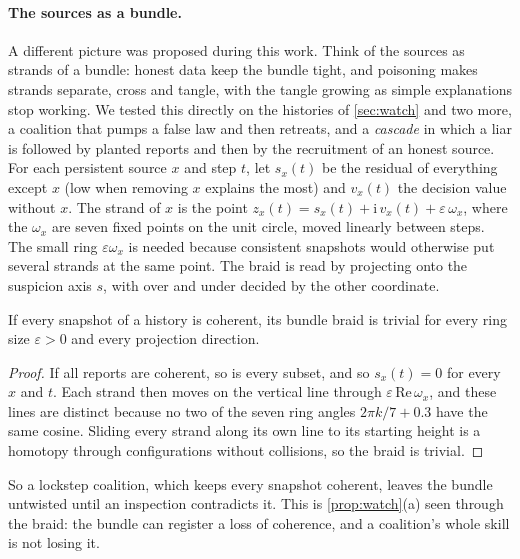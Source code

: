 \documentclass[11pt]{article}
\theoremstyle{definition}\newtheorem{definition}[theorem]{Definition}\newtheorem{remark}[theorem]{Remark}\newtheorem{example}[theorem]{Example}\newtheorem{problem}[theorem]{Open problem}\crefname{problem}{Problem}{Problems}
\begin{document}
\paragraph{The sources as a bundle.} A different picture was proposed during this work. Think of the sources as strands of a bundle: honest data keep the bundle tight, and poisoning makes strands separate, cross and tangle, with the tangle growing as simple explanations stop working. We tested this directly on the histories of \cref{sec:watch} and two more, a coalition that pumps a false law and then retreats, and a \emph{cascade} in which a liar is followed by planted reports and then by the recruitment of an honest source. For each persistent source $x$ and step $t$, let $s_x(t)$ be the residual of everything except $x$ (low when removing $x$ explains the most) and $v_x(t)$ the decision value without $x$. The strand of $x$ is the point $z_x(t)=s_x(t)+\mathrm i\,v_x(t)+\varepsilon\,\omega_x$, where the $\omega_x$ are seven fixed points on the unit circle, moved linearly between steps. The small ring $\varepsilon\omega_x$ is needed because consistent snapshots would otherwise put several strands at the same point. The braid is read by projecting onto the suspicion axis $s$, with over and under decided by the other coordinate.

\begin{proposition}\label{prop:cohtrivial}
If every snapshot of a history is coherent, its bundle braid is trivial for every ring size $\varepsilon>0$ and every projection direction.
\end{proposition}

\begin{proof}
If all reports are coherent, so is every subset, and so $s_x(t)=0$ for every $x$ and $t$. Each strand then moves on the vertical line through $\varepsilon\,\mathrm{Re}\,\omega_x$, and these lines are distinct because no two of the seven ring angles $2\pi k/7+0.3$ have the same cosine. Sliding every strand along its own line to its starting height is a homotopy through configurations without collisions, so the braid is trivial.
\end{proof}

So a lockstep coalition, which keeps every snapshot coherent, leaves the bundle untwisted until an inspection contradicts it. This is \cref{prop:watch}(a) seen through the braid: the bundle can register a loss of coherence, and a coalition's whole skill is not losing it.
\end{document}
